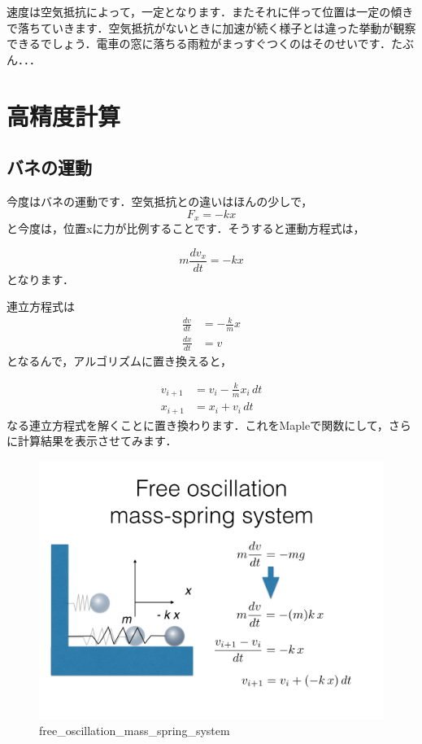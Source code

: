 \documentclass[11pt,dvipdfmx]{jsarticle}
\makeatletter
\def\maxwidth{\ifdim\Gin@nat@width>\linewidth\linewidth
    \else\Gin@nat@width\fi}
\let\Oldincludegraphics\includegraphics
\renewcommand{\includegraphics}[1]{\Oldincludegraphics[width=.8\maxwidth]{#1}}
\makeatother
\begin{document}
速度は空気抵抗によって，一定となります．またそれに伴って位置は一定の傾きで落ちていきます．空気抵抗がないときに加速が続く様子とは違った挙動が観察できるでしょう．電車の窓に落ちる雨粒がまっすぐつくのはそのせいです．たぶん．．．

    \section{高精度計算}\label{ux9ad8ux7cbeux5ea6ux8a08ux7b97}

\subsection{バネの運動}\label{ux30d0ux30cdux306eux904bux52d5}

今度はバネの運動です．空気抵抗との違いはほんの少しで， \[
F_x = -k x
\] と今度は，位置xに力が比例することです．そうすると運動方程式は，

\[
m \frac{dv_x}{dt} = - k x
\] となります．

連立方程式は \[
\begin{aligned}
\frac{dv}{dt} & = - \frac{k}{m}x \\
\frac{dx}{dt} & = v
\end{aligned}
\] となるんで，アルゴリズムに置き換えると，

\[
\begin{aligned}
v_{i+1} & = v_i - \frac{k}{m} x_i\, dt \\
x_{i+1} & = x_i + v_i\, dt
\end{aligned}
\]
なる連立方程式を解くことに置き換わります．これをMapleで関数にして，さらに計算結果を表示させてみます．

\begin{figure}[htbp]
\centering
\includegraphics{../figs/ode.004.jpeg}
\caption{free\_oscillation\_mass\_spring\_system}
\end{figure}
\end{document}
